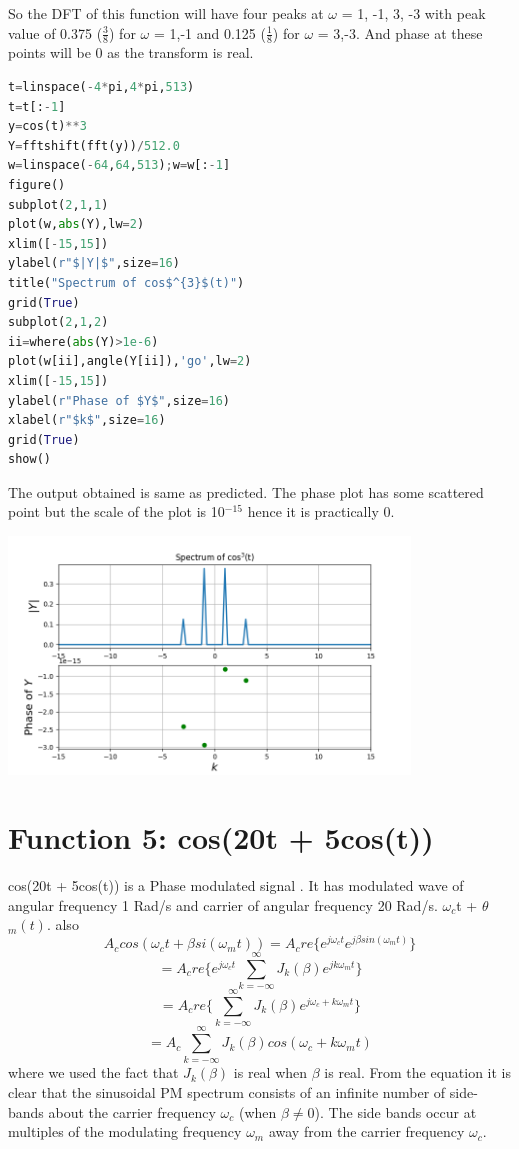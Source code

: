 \documentclass[a4paper]{article}
\begin{document}
So the DFT of this function will have four peaks at $\omega$ = 1, -1, 3, -3 with peak value of 0.375 ($\frac{3}{8}$) for $\omega$ = 1,-1 and 0.125 ($\frac{1}{8}$) for $\omega$ = 3,-3. And phase at these points will be 0 as the transform is real.
\begin{lstlisting}[language=Python]
t=linspace(-4*pi,4*pi,513)
t=t[:-1]
y=cos(t)**3
Y=fftshift(fft(y))/512.0
w=linspace(-64,64,513);w=w[:-1]
figure()
subplot(2,1,1)
plot(w,abs(Y),lw=2)
xlim([-15,15])
ylabel(r"$|Y|$",size=16)
title("Spectrum of cos$^{3}$(t)")
grid(True)
subplot(2,1,2)
ii=where(abs(Y)>1e-6)
plot(w[ii],angle(Y[ii]),'go',lw=2)
xlim([-15,15])
ylabel(r"Phase of $Y$",size=16)
xlabel(r"$k$",size=16)
grid(True)
show()
\end{lstlisting}
The output obtained is same as predicted. The phase plot has some scattered point but the scale of the plot is 10$^{-15}$ hence it is practically 0.
\begin{center}
\includegraphics[width=0.8\textwidth]{Figure_4.png}
\end{center}

\section{Function 5: cos(20t + 5cos(t))}
cos(20t + 5cos(t)) is a Phase modulated signal . It has modulated wave of angular frequency 1 Rad/s and carrier of angular frequency 20 Rad/s.  $\omega$$_{c}$t + $\theta$$_{m}(t)$.
also $$A_{c}cos(\omega_{c}t + \beta si(\omega_{m}t)) = A_{c}re\{e^{j{\omega_{c}t}} e^{j\beta sin(\omega_{m}t)}\}$$
$$ = A_{c}re\{e^{j{\omega_{c}t}} 
\sum_{k=-\infty}^{\infty} J_{k}(\beta)e^{jk\omega_{m}t}\}$$
$$ = A_{c}re\{\sum_{k=-\infty}^{\infty}J_{k}(\beta)e^{j{\omega_{c}+k\omega_{m}}t}\}$$
$$ = A_{c} \sum_{k=-\infty}^{\infty}J_{k}(\beta)cos({\omega_{c}+k\omega_{m}}t)$$
where we used the fact that $ J_k(\beta)$ is real when $ \beta $ is real. From the equation it is clear that the sinusoidal PM spectrum consists of an infinite number of side-bands about the carrier frequency $ \omega_c$ (when $ \beta\neq 0$). The side bands occur at multiples of the modulating frequency $ \omega_m$ away from the carrier frequency $ \omega_c$. 
\end{document}
